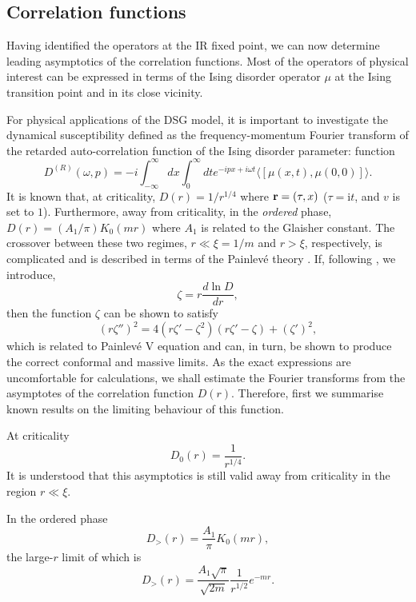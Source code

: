 \subsection{Correlation functions}

Having identified the operators at the IR fixed point,
we can now determine leading asymptotics of the correlation functions.
Most of the operators of physical interest
can be expressed in terms of the Ising disorder
operator $\mu$ at the Ising transition point
and in its close vicinity.

For physical applications of the DSG model, it is
important to investigate the dynamical susceptibility
defined as the frequency-momentum Fourier transform
of the retarded auto-correlation function of the Ising
disorder parameter:
function
\begin{equation}
D^{(R)}(\omega,p)= -i\int_{-\infty}^\infty dx
\int_0^\infty dt e^{-ipx+i\omega t}
\langle\left[\mu(x,t),\mu(0,0)\right]\rangle.
\label{ret}
\end{equation}
It is known that,
at criticality, $D(r)= 1/r^{1/4}$ where
${\bf r}=(\tau,x)$ ($\tau =\mbox{i} t$,
and $v$ is set to $1$). Furthermore,
away from criticality, in the
{\it ordered} phase, $D(r)=(A_1/\pi)K_0(mr)$
where $A_1$ is related to the Glaisher
constant. The crossover between these two regimes,
$r\ll \xi=1/m$ and $r> \xi$, respectively,
is complicated and is described in terms
of the Painlev\'{e} theory \cite{MC}.
If, following \cite{MC}, we introduce,
\[
\zeta=r \frac{d\ln D}{dr},
\]
then the function $\zeta$ can be shown to satisfy
\[
(r\zeta'')^2=
4(r\zeta'-\zeta^2)(r\zeta'-\zeta)+(\zeta')^2,
\]
which is related to Painlev\'{e} V equation and can,
in turn,
be shown to produce the correct conformal and massive
limits.
As the exact expressions are uncomfortable
for calculations, we shall estimate the
Fourier transforms from the asymptotes of the
correlation function $D(r)$. 
Therefore, first we summarise known
results on the limiting behaviour of this function.

At criticality
\begin{equation}
D_0(r)=\frac{1}{r^{1/4}}.
\label{Dnot}
\end{equation}
It is understood that this asymptotics is still valid
away from criticality in the region $r\ll\xi$.

In the ordered phase
\begin{equation}
D_>(r)=\frac{A_1}{\pi}K_0(mr),
\label{Dord}
\end{equation}
the large-$r$ limit of which is
\begin{equation}
D_>(r)=\frac{A_1\sqrt{\pi}}{\sqrt{2m}}\frac{1}{r^{1/2}}
e^{-mr}.
\label{Dordas}
\end{equation}

